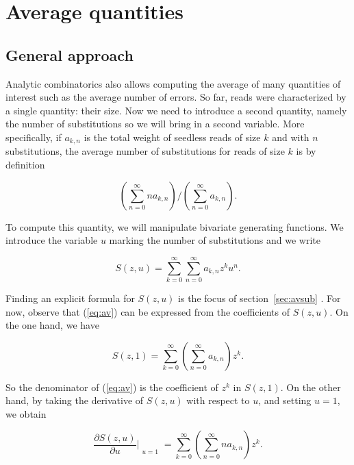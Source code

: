 \documentclass{article}
\begin{document}
\section{Average quantities}
\label{sec:av}

\subsection{General approach}
\label{sec:genapp}
Analytic combinatorics also allows computing the average of many
quantities of interest such as the average number of errors.  So far,
reads were characterized by a single quantity: their size. Now we need to
introduce a second quantity, namely the number of substitutions so we will
bring in a second variable. More specifically, if $a_{k,n}$ is the total
weight of seedless reads of size $k$ and with $n$ substitutions, the
average number of substitutions for reads of size $k$ is by definition


\begin{equation}
\label{eq:av}
\left( \sum_{n=0}^\infty na_{k,n} \right) \Big/
 \left( \sum_{n=0}^\infty a_{k,n} \right).
\end{equation}

To compute this quantity, we will manipulate bivariate generating
functions. We introduce the variable $u$ marking the number of
substitutions and we write

\begin{equation*}
S(z,u) = \sum_{k=0}^\infty\sum_{n=0}^\infty a_{k,n}z^ku^n.
\end{equation*}

Finding an explicit formula for $S(z,u)$ is the focus of
section~\ref{sec:avsub} .  For now, observe that (\ref{eq:av}) can be
expressed from the coefficients of $S(z,u)$. On the one hand, we have

\begin{equation*}
S(z,1) = \sum_{k=0}^\infty \left( \sum_{n=0}^\infty a_{k,n} \right) z^k.
\end{equation*}

So the denominator of (\ref{eq:av}) is the coefficient of $z^k$ in
$S(z,1)$. On the other hand, by taking the derivative of $S(z,u)$ with
respect to $u$, and setting $u=1$, we obtain

\begin{equation*}
\frac{\partial S(z,u)}{\partial u} \Bigr|_{\substack{\\u=1}} =
\sum_{k=0}^\infty \left( \sum_{n=0}^\infty na_{k,n} \right) z^k.
\end{equation*}
\end{document}
